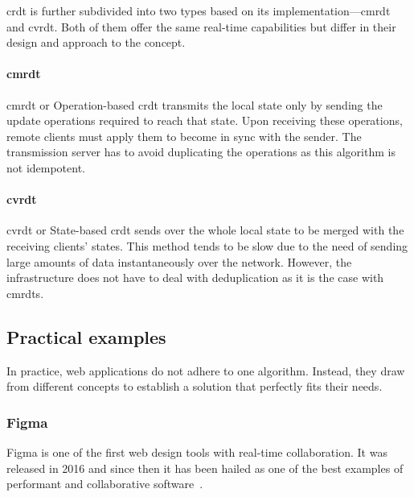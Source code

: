 \begin{toexclude}
  \acrshort{crdt} is further subdivided into two types based on its implementation---\acrfull{cmrdt} and \acrfull{cvrdt}. Both of them offer the same real-time capabilities but differ in their design and approach to the concept.

  \paragraph{\acrshort{cmrdt}}

  \acrlong{cmrdt} or Operation-based \acrshort{crdt} transmits the local state only by sending the update operations required to reach that state.
  Upon receiving these operations, remote clients must apply them to become in sync with the sender. The transmission server has to avoid duplicating the operations as this algorithm is not idempotent.

  \paragraph{\acrshort{cvrdt}}

  \acrlong{cvrdt} or State-based \acrshort{crdt} sends over the whole local state to be merged with the receiving clients' states. This method tends to be slow due to the need of sending large amounts of data instantaneously over the network. However, the infrastructure does not have to deal with deduplication as it is the case with \acrshort{cmrdt}s.

  \subsection{Practical examples}

  In practice, web applications do not adhere to one algorithm.
  Instead, they draw from different concepts to establish a solution that perfectly fits their needs.

  \subsubsection{Figma}


  Figma is one of the first web design tools with real-time collaboration.
  It was released in 2016 and since then it has been hailed as one of the best examples of performant and collaborative software~\autocite{tools_2020_nodate}.


\end{toexclude}
